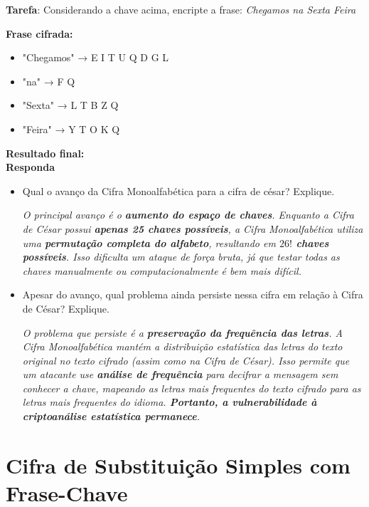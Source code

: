 \textbf{Tarefa}: Considerando a chave acima, encripte a frase:  \textit{Chegamos na Sexta Feira}

\textbf{Frase cifrada:}
\begin{itemize}


    \item     "Chegamos" → E I T U Q D G L

    \item     "na" → F Q

    \item    "Sexta" → L T B Z Q

    \item     "Feira" → Y T O K Q

\end{itemize}

\textbf{Resultado final:}
\\

\textbf{Responda}
\begin{itemize}
    \item Qual o avanço da Cifra Monoalfabética para a cifra de césar? Explique.

          \textit{O principal avanço é o \textbf{aumento do espaço de chaves}. Enquanto a Cifra de César possui \textbf{apenas 25 chaves possíveis}, a Cifra Monoalfabética utiliza uma \textbf{permutação completa do alfabeto}, resultando em \textbf{$26!$  chaves possíveis}. Isso dificulta um ataque de força bruta, já que testar todas as chaves manualmente ou computacionalmente é bem mais difícil.}

    \item Apesar do avanço, qual problema ainda persiste nessa cifra em relação à Cifra de César? Explique.

          \textit{    O problema que persiste é a \textbf{preservação da frequência das letras}. A Cifra Monoalfabética mantém a distribuição estatística das letras do texto original no texto cifrado (assim como na Cifra de César). Isso permite que um atacante use \textbf{análise de frequência} para decifrar a mensagem sem conhecer a chave, mapeando as letras mais frequentes do texto cifrado para as letras mais frequentes do idioma. \textbf{Portanto, a vulnerabilidade à criptoanálise estatística permanece}.}
\end{itemize}


\section{Cifra de Substituição Simples com Frase-Chave}

